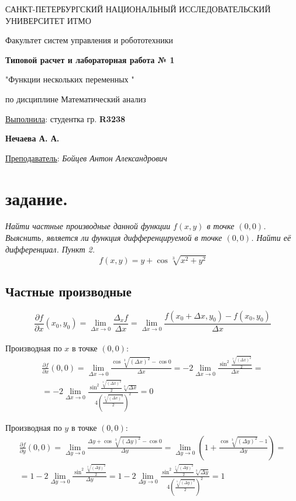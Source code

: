 \documentclass[a5paper, 10pt]{article}
\theoremstyle{definition}
\theoremstyle{plain}
\theoremstyle{remark}
\newcommand*{\titlePage}{
	\thispagestyle{title}
	\begingroup
	\begin{center}
		\vspace*{6ex}
		
		{\small
			САНКТ-ПЕТЕРБУРГСКИЙ НАЦИОНАЛЬНЫЙ ИССЛЕДОВАТЕЛЬСКИЙ УНИВЕРСИТЕТ ИТМО	
		}
		
		\vspace*{2ex}
		
		{\normalsize
			Факультет систем управления и робототехники
		}
		
		\vspace*{15ex}
		
		{\Large \bfseries 
			Типовой расчет и лабораторная работа № 1
		}
\vspace*{2ex}
	{\Large \bfseries 
			
"Функции нескольких переменных "
		}
\vspace*{2ex}
		
		{\normalsize
			по дисциплине Математический анализ
		}

	\end{center}
	\vspace*{20ex}
	\begin{flushright}
		{\large 
			\underline{Выполнила}: студентка гр. \textbf{R3238}\\
			\begin{flushright}
				\textbf{Нечаева А. А.}\\
			\end{flushright}
		}
		
		\vspace*{5ex}
		
		{\large 
			\underline{Преподаватель}: \textit{Бойцев Антон Александрович}
		}
	\end{flushright}	
	\newpage
	\setcounter{page}{1}
	\endgroup}
\begin{document}
	\titlePage
	\pagestyle{style}
\newpage

\section{задание.}
\textit{Найти частные производные данной функции $f(x, y)$ в точке $(0, 0)$. Выяснить, является ли функция дифференцируемой в точке $(0, 0)$. Найти её дифференциал. Пункт 2.}
\begin{equation}
f(x, y) = y + \cos \sqrt[3]{x^2 + y^2}
\end{equation}
\subsection{Частные производные}

\begin{equation}
\frac{\partial f}{\partial x} (x_0, y_0) = \lim_{\Delta x \to 0} \frac{\Delta_x f}{\Delta x} = \lim_{\Delta x \to 0} \frac{f ( x_0 + \Delta x, y_0) - f(x_0, y_0)}{\Delta x}
\end{equation}
\\

Производная по $x$ в точке $(0, 0)$:
\begin{multline}
\frac{\partial f}{\partial x} (0, 0) = \lim_{\Delta x \to 0} \frac{\cos \sqrt[3]{( \Delta x)^2} - \cos 0}{\Delta x} = 
-2 \lim_{\Delta x \to 0} \frac{\sin^2  \frac{ \sqrt[3]{( \Delta x)^2}}{2}}{\Delta x} =\\
= -2 \lim_{\Delta x \to 0} \frac{\sin^2  \frac{ \sqrt[3]{( \Delta x)^2}}{2} \sqrt[3]{ \Delta x}}{4 \left(\frac{ \sqrt[3]{( \Delta x)^2}}{2} \right)^2} = 0
\end{multline}


Производная по $y$ в точке $(0, 0)$:
\begin{multline}
\frac{\partial f}{\partial y} (0, 0) = \lim_{\Delta y \to 0} \frac{\Delta y + \cos \sqrt[3]{( \Delta y)^2} - \cos 0}{\Delta y} = 
\lim_{\Delta y \to 0} \left(1 +  \frac{\cos \sqrt[3]{( \Delta y)^2} - 1}{\Delta y} \right) =\\
= 1 - 2 \lim_{\Delta y \to 0} \frac{\sin^2  \frac{ \sqrt[3]{( \Delta y)^2}}{2}}{\Delta y} 
=1 -2 \lim_{\Delta y \to 0} \frac{\sin^2  \frac{ \sqrt[3]{( \Delta y)^2}}{2} \sqrt[3]{ \Delta y}}{4 \left(\frac{ \sqrt[3]{( \Delta y)^2}}{2} \right)^2} = 1
\end{multline}
\end{document}
